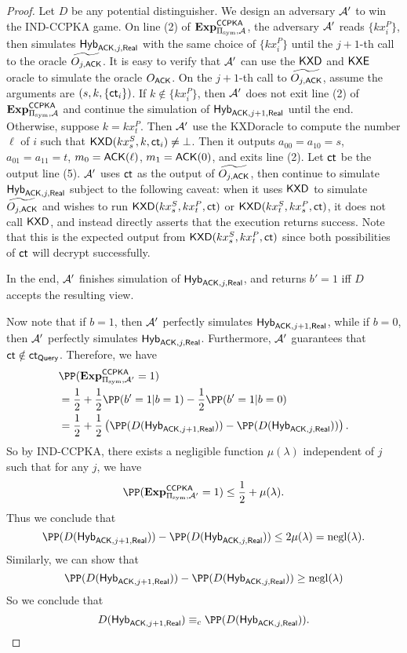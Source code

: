 \begin{proof}
    Let $D$ be any potential distinguisher. We design an adversary $\mathcal{A}'$ to win the IND-CCPKA game. On line (2) of $\mathbf{Exp}^{\mathsf{CCPKA}}_{\Pi_{\text{sym}}, \mathcal{A}}$, the adversary $\mathcal{A}'$ reads $\{kx_i^P\}$, then simulates $\mathsf{Hyb}_{\mathsf{ACK}, j, \mathsf{Real}}$ with the same choice of $\{kx_i^P\}$ until the $j + 1$-th call to the oracle $\widetilde{O_{j, \mathsf{ACK}}}$. It is easy to verify that $\mathcal{A}'$ can use the $\mathsf{KXD}$ and $\mathsf{KXE}$ oracle to simulate the oracle $O_{\mathsf{ACK}}$. On the $j + 1$-th call to $\widetilde{O_{j, \mathsf{ACK}}}$, assume the arguments are $(s, k, \{\mathsf{ct}_i\})$. If $k\notin \{kx_i^P\}$, then $\mathcal{A}'$ does not exit line (2) of $\mathbf{Exp}^{\mathsf{CCPKA}}_{\Pi_{\text{sym}}, \mathcal{A}}$ and continue the simulation of $\mathsf{Hyb}_{\mathsf{ACK}, j + 1, \mathsf{Real}}$ until the end. Otherwise, suppose $k = kx_{t}^P$. Then $\mathcal{A}'$ use the KXDoracle to compute the number $\ell$ of $i$ such that $\mathsf{KXD}(kx_s^S, k, \mathsf{ct}_i) \neq \bot$. Then it outputs $a_{00} = a_{10} = s$, $a_{01} = a_{11} = t$, $m_0 = \mathsf{ACK}(\ell)$, $m_1 = \mathsf{ACK}(0)$, and exits line (2). Let $\mathsf{ct}$ be the output line (5). $\mathcal{A}'$ uses $\mathsf{ct}$ as the output of $\widetilde{O_{j, \mathsf{ACK}}}$, then continue to simulate $\mathsf{Hyb}_{\mathsf{ACK}, j, \mathsf{Real}}$ subject to the following caveat: when it uses $\mathsf{KXD}$ to simulate $\widetilde{O_{j, \mathsf{ACK}}}$ and wishes to run $\mathsf{KXD}(kx_s^S, kx_t^P, \mathsf{ct})$ or $\mathsf{KXD}(kx_t^S, kx_s^P, \mathsf{ct})$, it does not call $\mathsf{KXD}$, and instead directly asserts that the execution returns success. Note that this is the expected output from $\mathsf{KXD}(kx_s^S, kx_t^P, \mathsf{ct})$ since both possibilities of $\mathsf{ct}$ will decrypt successfully. 

    In the end, $\mathcal{A}'$ finishes simulation of $\mathsf{Hyb}_{\mathsf{ACK}, j, \mathsf{Real}}$, and returns $b' = 1$ iff $D$ accepts the resulting view.

    Now note that if $b = 1$, then $\mathcal{A}'$ perfectly simulates $\mathsf{Hyb}_{\mathsf{ACK}, j + 1, \mathsf{Real}}$, while if $b = 0$, then $\mathcal{A}'$ perfectly simulates $\mathsf{Hyb}_{\mathsf{ACK}, j, \mathsf{Real}}$. Furthermore, $\mathcal{A}'$ guarantees that $\mathsf{ct} \notin \mathsf{ct}_{\mathsf{Query}}$. Therefore, we have
    \begin{align*}
     &\PP(\mathbf{Exp}^{\mathsf{CCPKA}}_{\Pi_{\sym}, \cA'} = 1) \\
     &= \frac{1}{2} + \frac{1}{2}\PP(b' = 1 | b = 1) - \frac{1}{2}\PP(b' = 1 | b = 0) \\   
     &= \frac{1}{2} + \frac{1}{2}\left(\PP(D(\Hyb_{\ACK, j + 1, \Real})) - \PP(D(\Hyb_{\ACK, j, \Real}))\right).
    \end{align*}
    So by IND-CCPKA, there exists a negligible function $\mu(\lambda)$ independent of $j$ such that for any $j$, we have
    $$\PP(\mathbf{Exp}^{\mathsf{CCPKA}}_{\Pi_{\sym}, \cA'} = 1) \leq \frac{1}{2} + \mu(\lambda).$$
    Thus we conclude that
    $$\PP(D(\Hyb_{\ACK, j + 1, \Real})) - \PP(D(\Hyb_{\ACK, j, \Real})) \leq 2\mu(\lambda) = \negl(\lambda).$$
    Similarly, we can show that
    $$\PP(D(\Hyb_{\ACK, j + 1, \Real})) - \PP(D(\Hyb_{\ACK, j, \Real})) \geq \negl(\lambda)$$
    So we conclude that
    $$D(\Hyb_{\ACK, j + 1, \Real}) \equiv_c \PP(D(\Hyb_{\ACK, j, \Real})).$$
\end{proof}
